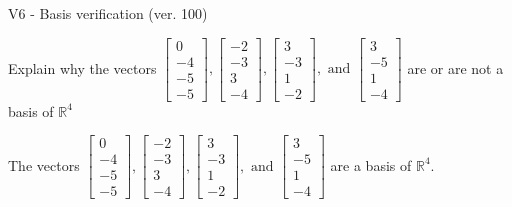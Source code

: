 \begin{exercise}
  \begin{exerciseTitle}V6 - Basis verification (ver. 100)\end{exerciseTitle}
  \begin{exerciseStatement}
    Explain why the vectors \(\left[\begin{array}{r}
0 \\
-4 \\
-5 \\
-5
\end{array}\right] , \left[\begin{array}{r}
-2 \\
-3 \\
3 \\
-4
\end{array}\right] , \left[\begin{array}{r}
3 \\
-3 \\
1 \\
-2
\end{array}\right] , \text{ and } \left[\begin{array}{r}
3 \\
-5 \\
1 \\
-4
\end{array}\right]\) are or are not a basis of \(\mathbb{R}^4\)	


  \end{exerciseStatement}
  \begin{exerciseAnswer}
   The vectors \(\left[\begin{array}{r}
0 \\
-4 \\
-5 \\
-5
\end{array}\right] , \left[\begin{array}{r}
-2 \\
-3 \\
3 \\
-4
\end{array}\right] , \left[\begin{array}{r}
3 \\
-3 \\
1 \\
-2
\end{array}\right] , \text{ and } \left[\begin{array}{r}
3 \\
-5 \\
1 \\
-4
\end{array}\right]\) 
  	 are  a basis of \(\mathbb{R}^4\).
  


  \end{exerciseAnswer}
\end{exercise}